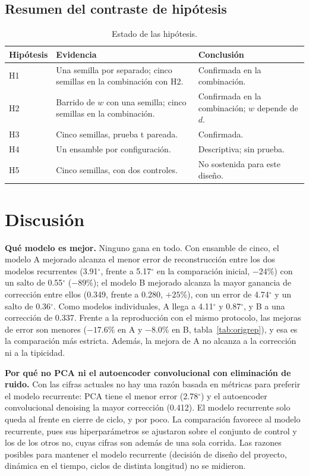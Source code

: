 \documentclass[11pt,a4paper]{amsart}
\newcommand{\gr}{$^{\circ}$}
\begin{document}
\subsection{Resumen del contraste de hipótesis}

\begin{table}[h]
\centering\small
\begin{tabularx}{\textwidth}{@{}l>{\raggedright\arraybackslash}X>{\raggedright\arraybackslash}p{4.7cm}@{}}
\toprule
Hipótesis & Evidencia & Conclusión \\
\midrule
H1 & Una semilla por separado; cinco semillas en la combinación con H2. & Confirmada en la combinación. \\
H2 & Barrido de $w$ con una semilla; cinco semillas en la combinación. & Confirmada en la combinación; $w$ depende de $d$. \\
H3 & Cinco semillas, prueba t pareada. & Confirmada. \\
H4 & Un ensamble por configuración. & Descriptiva; sin prueba. \\
H5 & Cinco semillas, con dos controles. & No sostenida para este diseño. \\
\bottomrule
\end{tabularx}
\caption{Estado de las hipótesis.}
\label{tab:hipotesis}
\end{table}

\section{Discusión}
\label{sec:discusion}

\textbf{Qué modelo es mejor.} Ninguno gana en todo. Con ensamble de cinco, el modelo A mejorado alcanza el menor error de reconstrucción entre los dos modelos recurrentes (3.91\gr, frente a 5.17\gr{} en la comparación inicial, $-24\%$) con un salto de 0.55\gr{} ($-89\%$); el modelo B mejorado alcanza la mayor ganancia de corrección entre ellos (0.349, frente a 0.280, $+25\%$), con un error de 4.74\gr{} y un salto de 0.36\gr. Como modelos individuales, A llega a 4.11\gr{} y 0.87\gr, y B a una corrección de 0.337. Frente a la reproducción con el mismo protocolo, las mejoras de error son menores ($-17.6\%$ en A y $-8.0\%$ en B, tabla~\ref{tab:origrep}), y esa es la comparación más estricta. Además, la mejora de A no alcanza a la corrección ni a la tipicidad.

\textbf{Por qué no PCA ni el autoencoder convolucional con eliminación de ruido.} Con las cifras actuales no hay una razón basada en métricas para preferir el modelo recurrente: PCA tiene el menor error (2.78\gr) y el autoencoder convolucional denoising la mayor corrección (0.412). El modelo recurrente solo queda al frente en cierre de ciclo, y por poco. La comparación favorece al modelo recurrente, pues sus hiperparámetros se ajustaron sobre el conjunto de control y los de los otros no, cuyas cifras son además de una sola corrida. Las razones posibles para mantener el modelo recurrente (decisión de diseño del proyecto, dinámica en el tiempo, ciclos de distinta longitud) no se midieron.
\end{document}
